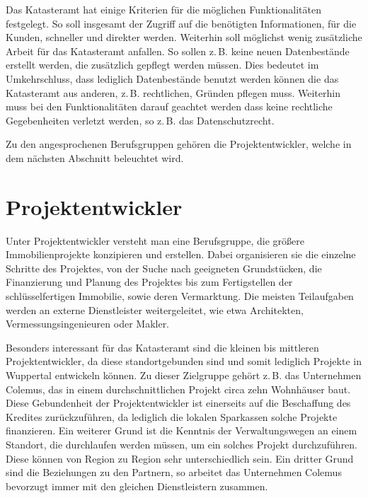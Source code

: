 Das Katasteramt hat einige Kriterien für die möglichen Funktionalitäten festgelegt. 
So soll insgesamt der Zugriff auf die benötigten Informationen, für die Kunden, schneller und direkter werden.
Weiterhin soll möglichst wenig zusätzliche Arbeit für das Katasteramt anfallen.
So sollen z.\,B. keine neuen Datenbestände erstellt werden, die zusätzlich gepflegt werden müssen.
Dies bedeutet im Umkehrschluss, dass lediglich Datenbestände benutzt werden können die das Katasteramt aus anderen, z.\,B. rechtlichen, Gründen pflegen muss.
Weiterhin muss bei den Funktionalitäten darauf geachtet werden dass keine rechtliche Gegebenheiten verletzt werden, so z.\,B. das Datenschutzrecht.

Zu den angesprochenen Berufsgruppen gehören die Projektentwickler, welche in dem nächsten Abschnitt beleuchtet wird.



\section{Projektentwickler}

Unter Projektentwickler versteht man eine Berufsgruppe, die größere Immobilienprojekte konzipieren und erstellen.
Dabei organisieren sie die einzelne Schritte des Projektes, von der Suche nach geeigneten Grundstücken, die Finanzierung und Planung des Projektes bis zum Fertigstellen der schlüsselfertigen Immobilie, sowie deren Vermarktung.
Die meisten Teilaufgaben werden an externe Dienstleister weitergeleitet, wie etwa Architekten, Vermessungsingenieuren oder Makler.

Besonders interessant für das Katasteramt sind die kleinen bis mittleren Projektentwickler, da diese standortgebunden sind und somit lediglich Projekte in Wuppertal entwickeln können.
Zu dieser Zielgruppe gehört z.\,B. das Unternehmen Colemus, das in einem durchschnittlichen Projekt circa zehn Wohnhäuser baut.
Diese Gebundenheit der Projektentwickler ist einerseits auf die Beschaffung des Kredites zurückzuführen, da lediglich die lokalen Sparkassen solche Projekte finanzieren.
Ein weiterer Grund ist die Kenntnis der Verwaltungswegen an einem Standort, die durchlaufen werden müssen, um ein solches Projekt durchzuführen.
Diese können von Region zu Region sehr unterschiedlich sein.
Ein dritter Grund sind die Beziehungen zu den Partnern, so arbeitet das Unternehmen Colemus bevorzugt immer mit den gleichen Dienstleistern zusammen.

